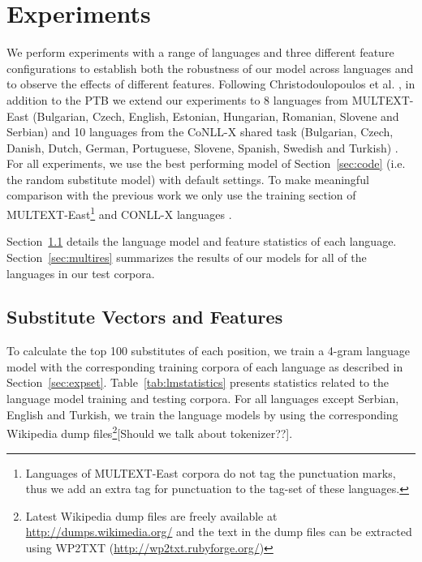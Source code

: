 \section{Experiments}
\label{sec:multilang}
\noindent We perform experiments with a range of languages and three
different feature configurations to establish both the robustness of
our model across languages and to observe the effects of different
features.  Following Christodoulopoulos et
al. , in
addition to the PTB we extend our experiments to 8 languages from
MULTEXT-East (Bulgarian, Czech, English, Estonian, Hungarian,
Romanian, Slovene and Serbian) \cite{citeulike:5820223} and 10
languages from the CoNLL-X shared task (Bulgarian, Czech, Danish,
Dutch, German, Portuguese, Slovene, Spanish, Swedish and Turkish)
\cite{Buchholz:2006:CST:1596276.1596305}.  For all experiments, we use
the best performing model of Section~\ref{sec:code} (i.e. the random
substitute model) with default settings.  To make meaningful
comparison with the previous work we only use the training section of
MULTEXT-East\footnote{Languages of MULTEXT-East corpora do not tag the
  punctuation marks, thus we add an extra tag for punctuation to the
  tag-set of these languages.} and CONLL-X languages
\cite{Lee:2010:STU:1870658.1870741}.  

Section~\ref{sec:multivecfeat} details the language model and feature
statistics of each language.  Section~\ref{sec:multires} summarizes
the results of our models for all of the languages in our test
corpora.

\subsection{Substitute Vectors and Features}
\label{sec:multivecfeat}
To calculate the top 100 substitutes of each position, we train a
4-gram language model with the corresponding training corpora of each
language as described in Section~\ref{sec:expset}.
Table~\ref{tab:lmstatistics} presents statistics related to the
language model training and testing corpora.  For all languages except
Serbian, English and Turkish, we train the language models by using
the corresponding Wikipedia dump files\footnote{Latest Wikipedia dump
  files are freely available at \url{http://dumps.wikimedia.org/} and
  the text in the dump files can be extracted using WP2TXT
  (\url{http://wp2txt.rubyforge.org/})}[Should we talk about
  tokenizer??].  

 

